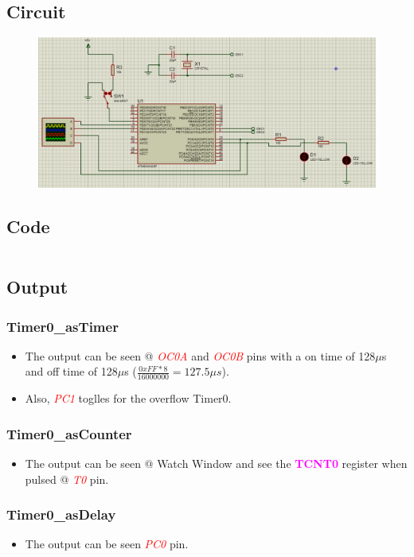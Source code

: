 \documentclass[oneside]{book}
\newcommand{\pinFormat}[1]{\emph{\textcolor{red}{#1}}}
\newcommand{\regFormat}[1]{\textbf{\textcolor{magenta}{#1}}}
\begin{document}
\subsection{Circuit}
\begin{figure}[H]
    \centering
    \includegraphics[height=0.2\textheight]{TimerCounter0_NormalMode.png}
\end{figure}
\subsection{Code}

\inputminted[breaklines, bgcolor=black]{c}{../programFiles/TimerCounter0_NormalMode.c}

\subsection{Output}
\subsubsection{Timer0\_asTimer}
\begin{itemize}
    \item The output can be seen @ \pinFormat{OC0A} and \pinFormat{OC0B} pins with a on time of 128$\mu$s and off time of 128$\mu$s ($\frac{0xFF * 8}{16000000} = 127.5\mu s$).
    \item Also, \pinFormat{PC1} toglles for the overflow Timer0.
\end{itemize}
\subsubsection{Timer0\_asCounter}
\begin{itemize}
    \item The output can be seen @ Watch Window and see the \regFormat{TCNT0} register when pulsed @ \pinFormat{T0} pin.
\end{itemize}
\subsubsection{Timer0\_asDelay}
\begin{itemize}
    \item The output can be seen \pinFormat{PC0} pin.
\end{itemize}
\end{document}
